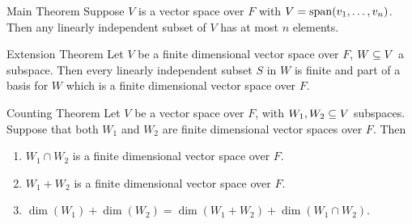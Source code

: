 \documentclass[class=article, crop=false]{standalone}
\begin{document}
  \begin{theorem}{Main Theorem}
    Suppose $V$ is a vector space over $F$ with $V = \operatorname{span}(v_1,\dotsc,v_n)$. Then any linearly independent subset of $V$ has at most $n$ elements.
  \end{theorem}
  \begin{theorem}{Extension Theorem}
    Let $V$ be a finite dimensional vector space over $F$, $W\subseteq V$ a subspace. Then every linearly independent subset $S$ in $W$ is finite and part of a basis for $W$ which is a finite dimensional vector space over $F$.
  \end{theorem}
  \begin{theorem}{Counting Theorem}
    Let $V$ be a vector space over $F$, with $W_1,W_2\subseteq V$ subspaces. Suppose that both $W_1$ and $W_2$ are finite dimensional vector spaces over $F$. Then
    \begin{enumerate}[label=(\alph*)]
      \item $W_1\cap W_2$ is a finite dimensional vector space over $F$.
      \item $W_1 + W_2$ is a finite dimensional vector space over $F$.
      \item $\dim(W_1) + \dim(W_2) = \dim(W_1 + W_2) + \dim(W_1\cap W_2)$.
    \end{enumerate}
  \end{theorem}
\end{document}
